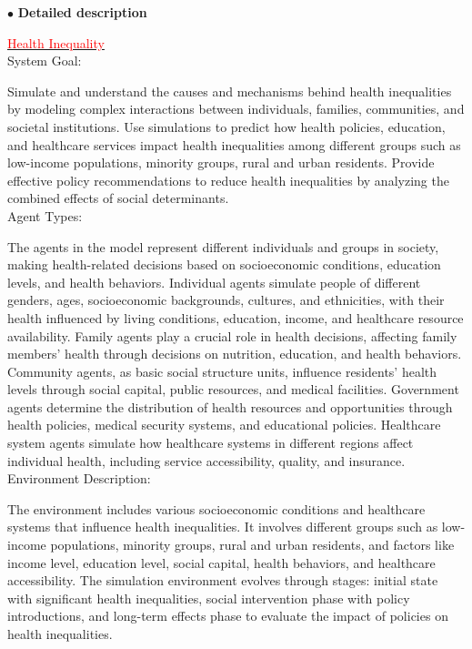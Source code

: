 \documentclass{article}
\theoremstyle{definition}
\theoremstyle{theorem}
\theoremstyle{proof}
\theoremstyle{remark}
\begin{document}
    $\bullet$ \textbf{Detailed description}

    \begin{textbox}
     \underline{\textcolor{red}{Health Inequality}}\\
     
        System Goal:
        
        Simulate and understand the causes and mechanisms behind health inequalities by modeling complex interactions between individuals, families, communities, and societal institutions. Use simulations to predict how health policies, education, and healthcare services impact health inequalities among different groups such as low-income populations, minority groups, rural and urban residents. Provide effective policy recommendations to reduce health inequalities by analyzing the combined effects of social determinants.\\

        Agent Types:

        The agents in the model represent different individuals and groups in society, making health-related decisions based on socioeconomic conditions, education levels, and health behaviors. Individual agents simulate people of different genders, ages, socioeconomic backgrounds, cultures, and ethnicities, with their health influenced by living conditions, education, income, and healthcare resource availability. Family agents play a crucial role in health decisions, affecting family members' health through decisions on nutrition, education, and health behaviors. Community agents, as basic social structure units, influence residents' health levels through social capital, public resources, and medical facilities. Government agents determine the distribution of health resources and opportunities through health policies, medical security systems, and educational policies. Healthcare system agents simulate how healthcare systems in different regions affect individual health, including service accessibility, quality, and insurance.\\

        Environment Description:

        The environment includes various socioeconomic conditions and healthcare systems that influence health inequalities. It involves different groups such as low-income populations, minority groups, rural and urban residents, and factors like income level, education level, social capital, health behaviors, and healthcare accessibility. The simulation environment evolves through stages: initial state with significant health inequalities, social intervention phase with policy introductions, and long-term effects phase to evaluate the impact of policies on health inequalities.
    \end{textbox}
\end{document}

